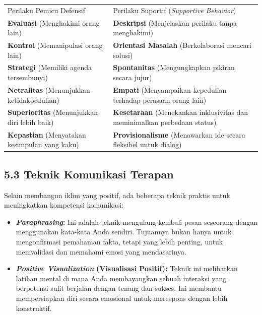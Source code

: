 \documentclass[
  letterpaper,
  DIV=11,
  numbers=noendperiod]{scrreprt}
\providecommand{\tightlist}{%
  \setlength{\itemsep}{0pt}\setlength{\parskip}{0pt}}
\begin{document}
\begin{longtable}[]{@{}
  >{\raggedright\arraybackslash}p{}
  >{\raggedright\arraybackslash}p{}@{}}
\toprule\noalign{}
\endhead
\bottomrule\noalign{}
\endlastfoot
Perilaku Pemicu Defensif & Perilaku Suportif (\emph{Supportive
Behavior}) \\
\textbf{Evaluasi} (Menghakimi orang lain) & \textbf{Deskripsi}
(Menjelaskan perilaku tanpa menghakimi) \\
\textbf{Kontrol} (Memanipulasi orang lain) & \textbf{Orientasi Masalah}
(Berkolaborasi mencari solusi) \\
\textbf{Strategi} (Memiliki agenda tersembunyi) & \textbf{Spontanitas}
(Mengungkapkan pikiran secara jujur) \\
\textbf{Netralitas} (Menunjukkan ketidakpedulian) & \textbf{Empati}
(Menyampaikan kepedulian terhadap perasaan orang lain) \\
\textbf{Superioritas} (Menunjukkan diri lebih baik) &
\textbf{Kesetaraan} (Menekankan inklusivitas dan meminimalkan perbedaan
status) \\
\textbf{Kepastian} (Menyatakan kesimpulan yang kaku) &
\textbf{Provisionalisme} (Menawarkan ide secara fleksibel untuk
dialog) \\
\end{longtable}

\subsection{\texorpdfstring{\textbf{5.3 Teknik Komunikasi
Terapan}}{5.3 Teknik Komunikasi Terapan}}\label{teknik-komunikasi-terapan}

Selain membangun iklim yang positif, ada beberapa teknik praktis untuk
meningkatkan kompetensi komunikasi:

\begin{itemize}
\tightlist
\item
  \emph{\textbf{Paraphrasing}}\textbf{:} Ini adalah teknik mengulang
  kembali pesan seseorang dengan menggunakan kata-kata Anda sendiri.
  Tujuannya bukan hanya untuk mengonfirmasi pemahaman fakta, tetapi yang
  lebih penting, untuk memvalidasi dan memahami emosi yang mendasarinya.
\item
  \emph{\textbf{Positive Visualization}} \textbf{(Visualisasi Positif):}
  Teknik ini melibatkan latihan mental di mana Anda membayangkan sebuah
  interaksi yang berpotensi sulit berjalan dengan tenang dan sukses. Ini
  membantu mempersiapkan diri secara emosional untuk merespons dengan
  lebih konstruktif.
\end{itemize}
\end{document}

